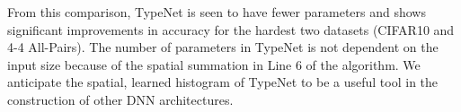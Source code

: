 \noindent
From this comparison, TypeNet is seen to have fewer parameters and shows significant improvements in accuracy for the hardest two datasets (CIFAR10 and 4-4 All-Pairs).  The number of parameters in TypeNet is not dependent on the input size because of the spatial summation in Line 6 of the algorithm.  We anticipate the spatial, learned histogram of TypeNet to be a useful tool in the construction of other DNN architectures.


